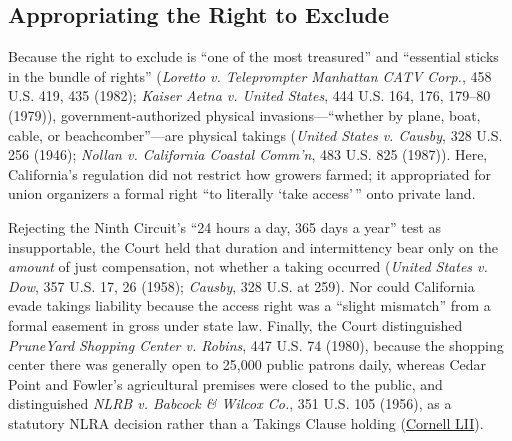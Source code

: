 \documentclass[12pt]{article}
\begin{document}
\subsection{Appropriating the Right to Exclude}
Because the right to exclude is ``one of the most treasured'' and ``essential sticks in the bundle of rights'' (\textit{Loretto v. Teleprompter Manhattan CATV Corp.}, 458 U.S. 419, 435 (1982); \textit{Kaiser Aetna v. United States}, 444 U.S. 164, 176, 179--80 (1979)), government-authorized physical invasions---``whether by plane, boat, cable, or beachcomber''---are physical takings (\textit{United States v. Causby}, 328 U.S. 256 (1946); \textit{Nollan v. California Coastal Comm'n}, 483 U.S. 825 (1987)). Here, California's regulation did not restrict how growers farmed; it appropriated for union organizers a formal right ``to literally `take access'\,'' onto private land.

Rejecting the Ninth Circuit's ``24 hours a day, 365 days a year'' test as insupportable, the Court held that duration and intermittency bear only on the \emph{amount} of just compensation, not whether a taking occurred (\textit{United States v. Dow}, 357 U.S. 17, 26 (1958); \textit{Causby}, 328 U.S. at 259). Nor could California evade takings liability because the access right was a ``slight mismatch'' from a formal easement in gross under state law. Finally, the Court distinguished \textit{PruneYard Shopping Center v. Robins}, 447 U.S. 74 (1980), because the shopping center there was generally open to 25,000 public patrons daily, whereas Cedar Point and Fowler's agricultural premises were closed to the public, and distinguished \textit{NLRB v. Babcock \& Wilcox Co.}, 351 U.S. 105 (1956), as a statutory NLRA decision rather than a Takings Clause holding (\href{https://www.law.cornell.edu/supremecourt/text/20-107}{Cornell LII}).
\end{document}
